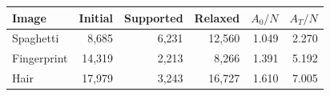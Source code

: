 \begin{tabular}{lrrrrr}
\toprule
Image & Initial & Supported & Relaxed & $A_0/N$ & $A_T/N$ \\
\midrule
Spaghetti & 8,685 & 6,231 & 12,560 & 1.049 & 2.270 \\
Fingerprint & 14,319 & 2,213 & 8,266 & 1.391 & 5.192 \\
Hair & 17,979 & 3,243 & 16,727 & 1.610 & 7.005 \\
\bottomrule
\end{tabular}
